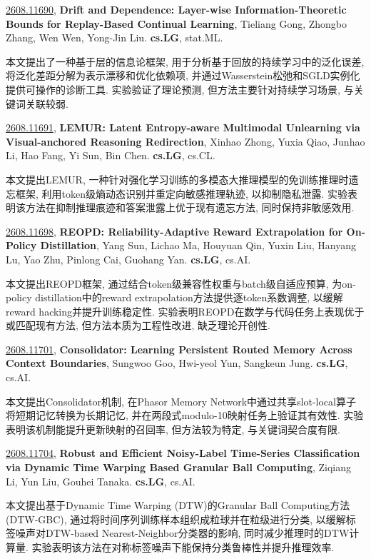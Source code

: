 \documentclass[9pt, a4paper]{article}
\theoremstyle{plain}
\theoremstyle{definition}
\theoremstyle{remark}
\newcommand{\arxivwithtarget}[3]{\hypertarget{#1}{}\href{https://arxiv.org/abs/#1}{#1}, \textbf{\textcolor{arxivblue}{#2}}, #3. }
\begin{document}
\arxivwithtarget{2608.11690}{Drift and Dependence: Layer-wise Information-Theoretic Bounds for Replay-Based Continual Learning}{Tieliang Gong, Zhongbo Zhang, Wen Wen, Yong-Jin Liu}\textbf{cs.LG}, stat.ML.

本文提出了一种基于层的信息论框架, 用于分析基于回放的持续学习中的泛化误差, 将泛化差距分解为表示漂移和优化依赖项, 并通过Wasserstein松弛和SGLD实例化提供可操作的诊断工具. 实验验证了理论预测, 但方法主要针对持续学习场景, 与关键词关联较弱.


\arxivwithtarget{2608.11691}{LEMUR: Latent Entropy-aware Multimodal Unlearning via Visual-anchored Reasoning Redirection}{Xinhao Zhong, Yuxia Qiao, Junhao Li, Hao Fang, Yi Sun, Bin Chen}\textbf{cs.LG}, cs.CL.

本文提出LEMUR, 一种针对强化学习训练的多模态大推理模型的免训练推理时遗忘框架, 利用token级熵动态识别并重定向敏感推理轨迹, 以抑制隐私泄露. 实验表明该方法在抑制推理痕迹和答案泄露上优于现有遗忘方法, 同时保持非敏感效用.


\arxivwithtarget{2608.11698}{REOPD: Reliability-Adaptive Reward Extrapolation for On-Policy Distillation}{Yang Sun, Lichao Ma, Houyuan Qin, Yuxin Liu, Hanyang Lu, Yao Zhu, Pinlong Cai, Guohang Yan}\textbf{cs.LG}, cs.AI.

本文提出REOPD框架, 通过结合token级兼容性权重与batch级自适应预算, 为on-policy distillation中的reward extrapolation方法提供逐token系数调整, 以缓解reward hacking并提升训练稳定性. 实验表明REOPD在数学与代码任务上表现优于或匹配现有方法, 但方法本质为工程性改进, 缺乏理论开创性.


\arxivwithtarget{2608.11701}{Consolidator: Learning Persistent Routed Memory Across Context Boundaries}{Sungwoo Goo, Hwi-yeol Yun, Sangkeun Jung}\textbf{cs.LG}, cs.AI.

本文提出Consolidator机制, 在Phasor Memory Network中通过共享slot-local算子将短期记忆转换为长期记忆, 并在两段式modulo-10映射任务上验证其有效性. 实验表明该机制能提升更新映射的召回率, 但方法较为特定, 与关键词契合度有限.


\arxivwithtarget{2608.11704}{Robust and Efficient Noisy-Label Time-Series Classification via Dynamic Time Warping Based Granular Ball Computing}{Ziqiang Li, Yun Liu, Gouhei Tanaka}\textbf{cs.LG}, cs.AI.

本文提出基于Dynamic Time Warping (DTW)的Granular Ball Computing方法(DTW-GBC), 通过将时间序列训练样本组织成粒球并在粒级进行分类, 以缓解标签噪声对DTW-based Nearest-Neighbor分类器的影响, 同时减少推理时的DTW计算量. 实验表明该方法在对称标签噪声下能保持分类鲁棒性并提升推理效率.
\end{document}
